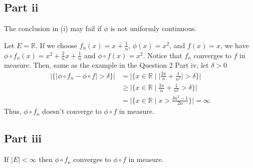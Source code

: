\subsection{Part ii}

\begin{question}
    The conclusion in (i) may fail if $\phi$ is not uniformly continuous.
\end{question}

\begin{answer}
    Let $E = \mathbb{R}$. If we choose $f_n(x) = x + \tfrac{1}{n}$, $\phi(x) = x^2$, and $f(x) = x$, we have $\phi\circ f_n(x) = x^2 + \tfrac{2}{n}x + \tfrac{1}{n}$ and $\phi\circ f(x) = x^2$. Notice that $f_n$ converges to $f$ in measure. Then, same as the example in the Question 2 Part iv, let $\delta > 0$
    \begin{equation}
        \begin{aligned}
            \lvert \{\lvert \phi\circ f_n - \phi\circ f \rvert > \delta\} \rvert &= \lvert \{x \in \mathbb{R} \mid \lvert \tfrac{2x}{n} + \tfrac{1}{n^2}\rvert > \delta\} \rvert\\
            &\geq  \lvert \{x \in \mathbb{R} \mid  \tfrac{2x}{n} + \tfrac{1}{n^2} > \delta\} \rvert\\
            &= \lvert \{ x \in \mathbb{R} \mid x > \tfrac{\delta n^2 - 1}{2n} \} \rvert = \infty
        \end{aligned}
    \end{equation}
    Thus, $\phi \circ f_n$ doesn't converge to $\phi \circ f$ in measure.
\end{answer}

\subsection{Part iii}

\begin{question}
   If $|E|<\infty$ then $\phi \circ f_n$ converges to $\phi \circ f$ in measure.
\end{question}

